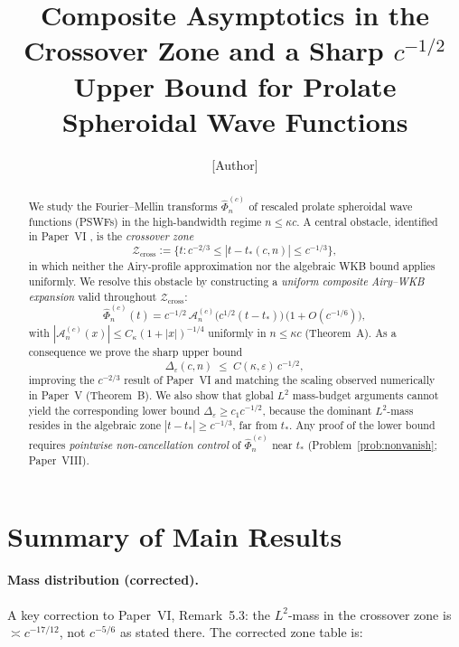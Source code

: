 \documentclass[12pt,a4paper]{amsart}
\theoremstyle{definition}
\theoremstyle{remark}
\newcommand{\Zcross}{\mathcal{Z}_{\mathrm{cross}}}
\newcommand{\tstar}{t_*}
\begin{document}
\title[Crossover Zone and $c^{-1/2}$ Upper Bound for PSWFs]{%
Composite Asymptotics in the Crossover Zone
and a Sharp $c^{-1/2}$ Upper Bound
for Prolate Spheroidal Wave Functions}

\author{[Author]}
\address{[Address]}
\email{[Email]}

\maketitle

\begin{abstract}
We study the Fourier--Mellin transforms
$\widehat{\Phi}_n^{(c)}$ of rescaled prolate
spheroidal wave functions (PSWFs) in the
high-bandwidth regime $n \le \kappa c$.
A central obstacle, identified in Paper~VI
\cite{PaperVI}, is the \emph{crossover zone}
\[
\Zcross := \bigl\{t : c^{-2/3} \le |t - t_*(c,n)|
\le c^{-1/3}\bigr\},
\]
in which neither the Airy-profile approximation
nor the algebraic WKB bound applies uniformly.
We resolve this obstacle by constructing a
\emph{uniform composite Airy--WKB expansion}
valid throughout $\Zcross$:
\[
\widehat{\Phi}_n^{(c)}(t)
= c^{-1/2}\,\mathcal{A}_n^{(c)}\!
  \bigl(c^{1/2}(t-\tstar)\bigr)
\,\bigl(1 + O(c^{-1/6})\bigr),
\]
with $|\mathcal{A}_n^{(c)}(x)| \le
C_\kappa(1+|x|)^{-1/4}$ uniformly in
$n \le \kappa c$ (Theorem~A).
As a consequence we prove the sharp upper bound
\[
\Delta_\varepsilon(c,n)
\;\le\; C(\kappa,\varepsilon)\,c^{-1/2},
\]
improving the $c^{-2/3}$ result of Paper~VI
and matching the scaling observed numerically
in Paper~V \cite{PaperV} (Theorem~B).
We also show that global $L^2$ mass-budget
arguments cannot yield the corresponding lower
bound $\Delta_\varepsilon \ge c_1 c^{-1/2}$,
because the dominant $L^2$-mass resides in the
algebraic zone $|t - \tstar| \ge c^{-1/3}$,
far from $t_*$.
Any proof of the lower bound requires
\emph{pointwise non-cancellation control} of
$\widehat{\Phi}_n^{(c)}$ near $t_*$
(Problem~\ref{prob:nonvanish}; Paper~VIII).
\end{abstract}

\section*{Summary of Main Results}

\paragraph{Mass distribution (corrected).}
A key correction to Paper~VI, Remark~5.3:
the $L^2$-mass in the crossover zone is
$\asymp c^{-17/12}$, not $c^{-5/6}$ as stated there.
The corrected zone table is:
\end{document}
